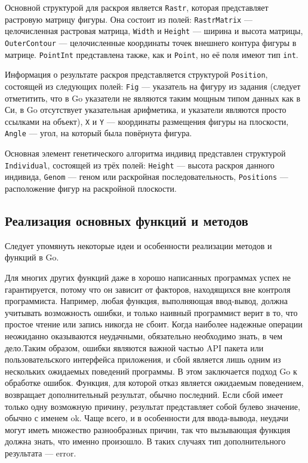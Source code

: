 \documentclass[14pt]{extarticle}
\begin{document}
	Основной структурой для раскроя является \lstinline|Rastr|, которая представляет растровую матрицу фигуры. Она состоит из полей: \lstinline|RastrMatrix| --- целочисленная растровая матрица, \lstinline|Width| и \lstinline|Height| --- ширина и высота матрицы, \lstinline|OuterContour| --- целочисленные координаты точек внешнего контура фигуры в матрице. \lstinline|PointInt| представлена также, как и \lstinline|Point|, но её поля имеют тип \lstinline|int|.
	
	
	Информация о результате раскроя представляется структурой \lstinline|Position|, состоящей из следующих полей: \lstinline|Fig| --- указатель на фигуру из задания (следует отметитить, что в Go указатели не являются таким мощным типом данных как в Си, в Go отсутствует указательная арифметика, и указатели являются просто ссылками на объект), \lstinline|X| и \lstinline|Y| --- координаты размещения фигуры на плоскости, \lstinline|Angle| --- угол, на который была повёрнута фигура.
	

	
	Основная элемент генетического алгоритма индивид представлен структурой \lstinline|Individual|, состоящей из трёх полей: \lstinline|Height| --- высота раскроя данного индивида, \lstinline|Genom| --- геном или раскройная последовательность, \lstinline|Positions| --- расположение фигур на раскройной плоскости.
	
	
	\subsection{Реализация основных функций и методов}
	Следует упомянуть некоторые идеи и особенности реализации методов и функций в Go. 
	
	Для многих других функций даже в хорошо написанных программах успех не гарантируется, потому что он зависит от факторов, находящихся вне контроля програм­миста. Например, любая функция, выполняющая ввод-вывод, должна  учитывать воз­можность ошибки, и только наивный программист верит в то, что простое чтение или запись никогда не сбоит. Когда наиболее надежные операции неожиданно оказыва­ются неудачными, обязательно необходимо знать, в чем дело.Таким образом, ошибки являются важной частью API пакета или пользовательского интерфейса приложения, и сбой является лишь одним из нескольких ожидаемых поведений программы. В этом 	заключается подход Go к обработке ошибок. Функция, для которой отказ является ожидаемым поведением, возвращает дополнительный результат, обычно последний. Если сбой имеет только одну возможную причину, результат представляет собой булево значение, обычно с именем ok. Чаще всего, и в особенности для ввода-вывода, неудачи могут иметь множество разнообразных причин, так что вызывающая функция должна знать, что именно про­изошло. В таких случаях тип дополнительного результата — error.
	
\end{document}
